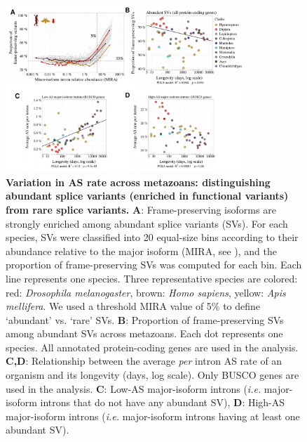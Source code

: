 \begin{figure}[t]   
    \begin{center}                                                                       
        \includegraphics[width=0.8\textwidth] {Figure4.pdf}
    \end{center}                                                                       
    \caption[Variation in AS rate across metazoans: distinguishing abundant splice variants (enriched in functional variants) from rare splice variants]{\textbf{Variation in AS rate across metazoans: distinguishing abundant splice variants (enriched in functional variants) from rare splice variants.} \textbf{A}: Frame-preserving isoforms are strongly enriched among abundant splice variants (\acrshort{SV}s). For each species, \acrshort{SV}s were classified into 20 equal-size bins according to their abundance relative to the major isoform (MIRA, see ), and the proportion of frame-preserving \acrshort{SV}s was computed for each bin. Each line represents one species. Three representative species are colored: red: \textit{Drosophila melanogaster}, brown: \textit{Homo sapiens}, yellow: \textit{Apis mellifera}. We used a threshold MIRA value of 5\% to define ‘abundant’ vs. ‘rare’ \acrshort{SV}s. \textbf{B}: Proportion of frame-preserving \acrshort{SV}s among abundant \acrshort{SV}s across metazoans. Each dot represents one species. All annotated protein-coding genes are used in the analysis. \textbf{C,D}: Relationship between the average \textit{per} intron AS rate of an organism and its longevity (days, log scale). Only \acrshort{BUSCO} genes are used in the analysis. \textbf{C}: Low-AS major-isoform introns (\textit{i.e.} major-isoform introns that do not have any abundant \acrshort{SV}), \textbf{D}: High-AS major-isoform introns (\textit{i.e.} major-isoform introns having at least one abundant \acrshort{SV}).\newline}
    \label{fig:AS4}
\end{figure}

